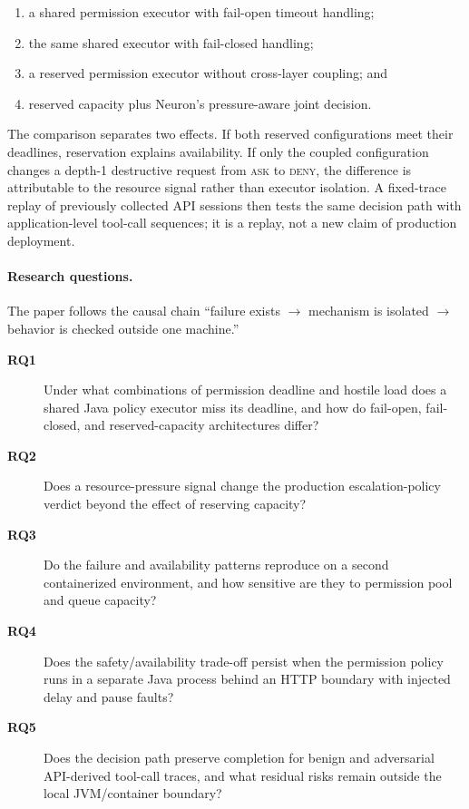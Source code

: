 \begin{enumerate}
  \item a shared permission executor with fail-open timeout handling;
  \item the same shared executor with fail-closed handling;
  \item a reserved permission executor without cross-layer coupling; and
  \item reserved capacity plus Neuron's pressure-aware joint decision.
\end{enumerate}

The comparison separates two effects. If both reserved configurations meet
their deadlines, reservation explains availability. If only the coupled
configuration changes a depth-1 destructive request from \textsc{ask} to
\textsc{deny}, the difference is attributable to the resource signal rather
than executor isolation. A fixed-trace replay of previously collected API
sessions then tests the same decision path with application-level tool-call
sequences; it is a replay, not a new claim of production deployment.

\paragraph{Research questions.}
The paper follows the causal chain ``failure exists $\rightarrow$ mechanism
is isolated $\rightarrow$ behavior is checked outside one machine.''

\begin{description}
  \item[\textbf{RQ1}] Under what combinations of permission deadline and
  hostile load does a shared Java policy executor miss its deadline, and how
  do fail-open, fail-closed, and reserved-capacity architectures differ?
  \item[\textbf{RQ2}] Does a resource-pressure signal change the production
  escalation-policy verdict beyond the effect of reserving capacity?
  \item[\textbf{RQ3}] Do the failure and availability patterns reproduce on a
  second containerized environment, and how sensitive are they to permission
  pool and queue capacity?
  \item[\textbf{RQ4}] Does the safety/availability trade-off persist when the
  permission policy runs in a separate Java process behind an HTTP boundary
  with injected delay and pause faults?
  \item[\textbf{RQ5}] Does the decision path preserve completion for benign
  and adversarial API-derived tool-call traces, and what residual risks remain
  outside the local JVM/container boundary?
\end{description}

